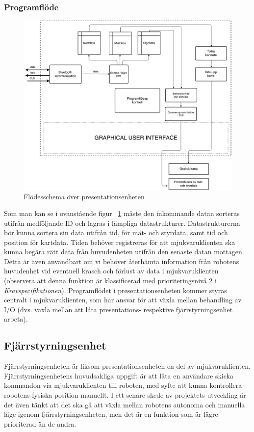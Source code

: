 \documentclass{article}
\begin{document}
\subsubsection{Programflöde}
\begin{figure}[H]
\centering 
\includegraphics[scale=0.3]{Presentationsenhet}
\caption{Flödesschema över presentationsenheten}
\label{fig:Presentationsenhet}
\end{figure}
Som man kan se i ovanstående figur ~\ref{fig:Presentationsenhet} måste den inkommande datan sorteras utifrån medföljande ID och lagras i lämpliga datastrukturer. Datastrukturerna bör kunna sortera sin data utifrån tid, för mät- och styrdata, samt tid och position för kartdata. Tiden behöver registreras för att mjukvaruklienten ska kunna begära rätt data från huvudenheten utifrån den senaste datan mottagen. Detta är även användbart om vi behöver återhämta information från robotens huvudenhet vid eventuell krasch och förlust av data i mjukvaruklienten (observera att denna funktion är klassificerad med prioriteringsnivå 2 i \textit{Kravspecifikationen}). Programflödet i presentationsenheten kommer styras centralt i mjukvaruklienten, som har ansvar för att växla mellan behandling av I/O (dvs. växla mellan att låta presentations- respektive fjärrstyrningsenhet arbeta). 

\clearpage

\subsection{Fjärrstyrningsenhet}
Fjärrstyrningsenheten är liksom presentationsenheten en del av mjukvaruklienten. Fjärrstyrningsenhetens huvudsakliga uppgift är att låta en användare skicka kommandon via mjukvaruklienten till roboten, med syfte att kunna kontrollera robotens fysiska position manuellt. I ett senare skede av projektets utveckling är det även tänkt att det ska gå att växla mellan robotens autonoma och manuella läge igenom fjärrstyrningsenheten, men det är en funktion som är lägre prioriterad än de andra.
\end{document}
